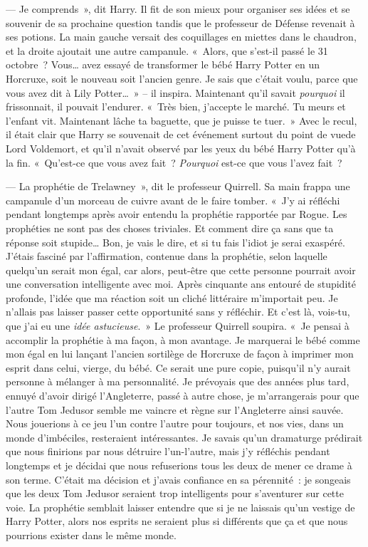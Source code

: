 --- Je comprends~», dit Harry. Il fit de son mieux pour organiser ses idées et se souvenir de sa prochaine question tandis que le professeur de Défense revenait à ses potions. La main gauche versait des coquillages en miettes dans le chaudron, et la droite ajoutait une autre campanule. «~Alors, que s'est-il passé le 31 octobre~? Vous… avez essayé de transformer le bébé Harry Potter en un Horcruxe, soit le nouveau soit l'ancien genre. Je sais que c'était voulu, parce que vous avez dit à Lily Potter…~» -- il inspira. Maintenant qu'il savait \emph{pourquoi} il frissonnait, il pouvait l'endurer. «~Très bien, j'accepte le marché. Tu meurs et l'enfant vit. Maintenant lâche ta baguette, que je puisse te tuer.~» Avec le recul, il était clair que Harry se souvenait de cet événement surtout du point de vuede Lord Voldemort, et qu'il n'avait observé par les yeux du bébé Harry Potter qu'à la fin. «~Qu'est-ce que vous avez fait~? \emph{Pourquoi} est-ce que vous l'avez fait~?

--- La prophétie de Trelawney~», dit le professeur Quirrell. Sa main frappa une campanule d'un morceau de cuivre avant de le faire tomber. «~J'y ai réfléchi pendant longtemps après avoir entendu la prophétie rapportée par Rogue. Les prophéties ne sont pas des choses triviales. Et comment dire ça sans que ta réponse soit stupide… Bon, je vais le dire, et si tu fais l'idiot je serai exaspéré. J'étais fasciné par l'affirmation, contenue dans la prophétie, selon laquelle quelqu'un serait mon égal, car alors, peut-être que cette personne pourrait avoir une conversation intelligente avec moi. Après cinquante ans entouré de stupidité profonde, l'idée que ma réaction soit un cliché littéraire m'importait peu. Je n'allais pas laisser passer cette opportunité sans y réfléchir. Et c'est là, vois-tu, que j'ai eu une \emph{idée astucieuse}.~» Le professeur Quirrell soupira. «~Je pensai à accomplir la prophétie à ma façon, à mon avantage. Je marquerai le bébé comme mon égal en lui lançant l'ancien sortilège de Horcruxe de façon à imprimer mon esprit dans celui, vierge, du bébé. Ce serait une pure copie, puisqu'il n'y aurait personne à mélanger à ma personnalité. Je prévoyais que des années plus tard, ennuyé d'avoir dirigé l'Angleterre, passé à autre chose, je m'arrangerais pour que l'autre Tom Jedusor semble me vaincre et règne sur l'Angleterre ainsi sauvée. Nous jouerions à ce jeu l'un contre l'autre pour toujours, et nos vies, dans un monde d'imbéciles, resteraient intéressantes. Je savais qu'un dramaturge prédirait que nous finirions par nous détruire l'un-l'autre, mais j'y réfléchis pendant longtemps et je décidai que nous refuserions tous les deux de mener ce drame à son terme. C'était ma décision et j'avais confiance en sa pérennité~: je songeais que les deux Tom Jedusor seraient trop intelligents pour s'aventurer sur cette voie. La prophétie semblait laisser entendre que si je ne laissais qu'un vestige de Harry Potter, alors nos esprits ne seraient plus si différents que ça et que nous pourrions exister dans le même monde.

